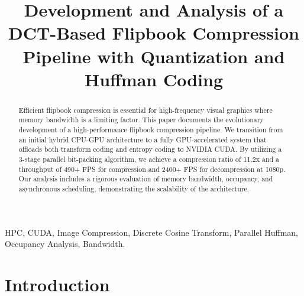 \documentclass[conference]{IEEEtran}
\begin{document}
\title{
Development and Analysis of a DCT-Based Flipbook Compression Pipeline with Quantization and Huffman Coding
}

\author{
    \and
    \and
}

\maketitle

\begin{abstract}
Efficient flipbook compression is essential for high-frequency visual graphics where memory bandwidth is a limiting factor. This paper documents the evolutionary development of a high-performance flipbook compression pipeline. We transition from an initial hybrid CPU-GPU architecture to a fully GPU-accelerated system that offloads both transform coding and entropy coding to NVIDIA CUDA. By utilizing a 3-stage parallel bit-packing algorithm, we achieve a compression ratio of 11.2x and a throughput of 490+ FPS for compression and 2400+ FPS for decompression at 1080p. Our analysis includes a rigorous evaluation of memory bandwidth, occupancy, and asynchronous scheduling, demonstrating the scalability of the architecture.
\end{abstract}

\begin{IEEEkeywords}
HPC, CUDA, Image Compression, Discrete Cosine Transform, Parallel Huffman, Occupancy Analysis, Bandwidth.
\end{IEEEkeywords}

\section{Introduction}
\end{document}
